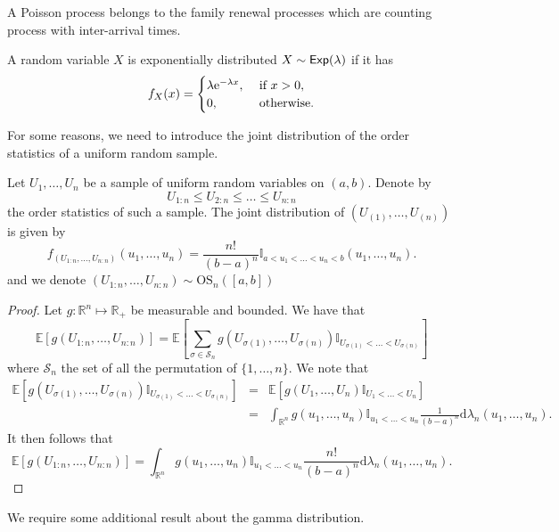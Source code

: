 \begin{remark}\label{def_renewal_process}
A Poisson process belongs to the family renewal processes which are counting process with \iid inter-arrival times.
\end{remark}
\begin{definition}\label{def:exp_dist}
A random variable $X$ is exponentially distributed $X\sim\mathsf{Exp}(\lambda)$ if it has \pdf
$$
f_X(x) =\begin{cases} 
\lambda\mathrm{e}^{-\lambda x},&\text{ if }x>0,\\
0,&\text{ otherwise}.
\end{cases}
$$
\end{definition}
For some reasons, we need to introduce the joint distribution of the order statistics of a uniform random sample.
\begin{prop}\label{def:uniform_OS_dist}
Let $U_1,\ldots, U_n$ be a sample of \iid uniform random variables on $(a,b)$. Denote by 
$$
U_{1:n}\leq U_{2:n}\leq\ldots\leq U_{n:n}
$$
the order statistics of such a sample. The joint distribution of $(U_{(1)},\ldots,  U_{(n)})$ is given by 
$$
f_{(U_{1:n},\ldots, U_{n:n})}(u_1,\ldots, u_n)=\frac{n!}{(b-a)^n}\mathbb{I}_{a<u_1<\ldots< u_n<b}(u_1,\ldots, u_n).
$$
and we denote $(U_{1:n},\ldots,  U_{n:n})\sim \text{OS}_n([a,b])$
\end{prop}
\begin{proof}
Let $g:\mathbb{R}^n\mapsto \mathbb{R}_+$ be measurable and bounded. We have that
$$
\mathbb{E}[g(U_{1:n},\ldots,U_{n:n})]=\mathbb{E}\left[\sum_{\sigma\in\mathcal{S}_n}
g(U_{\sigma(1)},\ldots,U_{\sigma(n)})
\mathbb{I}_{U_{\sigma(1)} <\ldots< U_{\sigma(n)}}
\right]
$$
where $\mathcal{S}_n$ the set of all the permutation of $\{1,\ldots,n \}$. We note that
\begin{eqnarray*}
\mathbb{E}\left[g(U_{\sigma(1)},\ldots,U_{\sigma(n)})
\mathbb{I}_{U_{\sigma(1)} <\ldots< U_{\sigma(n)}}
\right]&=& \mathbb{E}\left[g(U_{1},\ldots,U_{n})
\mathbb{I}_{U_{1} <\ldots< U_{n}}\right]\\
&=&\int_{\mathbb{R}^{n}}g(u_{1},\ldots,u_{n})
\mathbb{I}_{u_{1} <\ldots< u_{n}}\frac{1}{(b-a)^n}\text{d}\lambda_{n}(u_1,\ldots, u_n).
\end{eqnarray*}
It then follows that
$$
\mathbb{E}[g(U_{1:n},\ldots,U_{n:n})]=\int_{\mathbb{R}^{n}}g(u_{1},\ldots,u_{n})
\mathbb{I}_{u_{1} <\ldots< u_{n}}\frac{n!}{(b-a)^n}\text{d}\lambda_{n}(u_1,\ldots, u_n).
$$
\end{proof}
We require some additional result about the gamma distribution.
